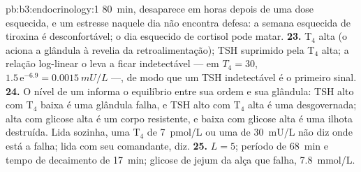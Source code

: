 \begin{solution}{pb:b3:endocrinology:1}
\qty{80}{min}, desaparece em horas depois de uma dose esquecida, e um
estresse naquele dia não encontra defesa: a semana esquecida de tiroxina
é desconfortável; o dia esquecido de cortisol pode matar.
\textbf{23.} T$_{4}$ alta (o  aciona a glândula à revelia da
retroalimentação); TSH suprimido pela T$_{4}$ alta; a relação log-linear
o leva a ficar indetectável --- em $T_{4} = 30$, $1.5\,\mathrm{e}^{-6.9}
= \qty{0.0015}{mU/L}$ ---, de modo que um TSH indetectável é o primeiro
sinal.
\textbf{24.} O nível de um  informa o equilíbrio entre sua ordem
e sua glândula: TSH alto com T$_{4}$ baixa é uma glândula falha, e TSH
alto com T$_{4}$ alta é uma  desgovernada;  alta com
glicose alta é um corpo resistente, e  baixa com glicose alta é
uma ilhota destruída. Lida sozinha, uma T$_{4}$ de \qty{7}{pmol/L} ou
uma  de \qty{30}{mU/L} não diz onde está a falha; lida com seu
comandante, diz.
\textbf{25.}  $L = 5$; período de \qty{68}{min} e tempo de
decaimento de \qty{17}{min}; glicose de jejum da alça que falha,
\qty{7.8}{mmol/L}.
\end{solution}
